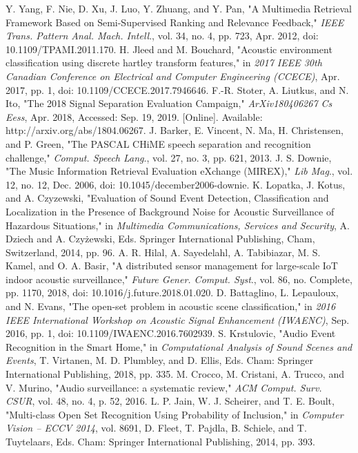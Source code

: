\documentclass{ieeeaccess}
\begin{document}
\begin{thebibliography}{00}
	Y. Yang, F. Nie, D. Xu, J. Luo, Y. Zhuang, and Y. Pan, "A Multimedia Retrieval Framework Based on Semi-Supervised Ranking and Relevance Feedback," \textit{IEEE Trans. Pattern Anal. Mach. Intell}., vol. 34, no. 4, pp. 723, Apr. 2012, doi: 10.1109/TPAMI.2011.170.
	H. Jleed and M. Bouchard, "Acoustic environment classification using discrete hartley transform features," in \textit{2017 IEEE 30th Canadian Conference on Electrical and Computer Engineering (CCECE)}, Apr. 2017, pp. 1, doi: 10.1109/CCECE.2017.7946646.
	F.-R. Stoter, A. Liutkus, and N. Ito, "The 2018 Signal Separation Evaluation Campaign," \textit{ArXiv180406267 Cs Eess}, Apr. 2018, Accessed: Sep. 19, 2019. [Online]. Available: http://arxiv.org/abs/1804.06267.
	J. Barker, E. Vincent, N. Ma, H. Christensen, and P. Green, "The PASCAL CHiME speech separation and recognition challenge," \textit{Comput. Speech Lang}., vol. 27, no. 3, pp. 621, 2013.
	J. S. Downie, "The Music Information Retrieval Evaluation eXchange (MIREX)," \textit{Lib Mag}., vol. 12, no. 12, Dec. 2006, doi: 10.1045/december2006-downie.
	K. Lopatka, J. Kotus, and A. Czyzewski, "Evaluation of Sound Event Detection, Classification and Localization in the Presence of Background Noise for Acoustic Surveillance of Hazardous Situations," in \textit{Multimedia Communications, Services and Security}, A. Dziech and A. Czyżewski, Eds. Springer International Publishing, Cham, Switzerland, 2014, pp. 96.
	A. R. Hilal, A. Sayedelahl, A. Tabibiazar, M. S. Kamel, and O. A. Basir, "A distributed sensor management for large-scale IoT indoor acoustic surveillance," \textit{Future Gener. Comput. Syst}., vol. 86, no. Complete, pp. 1170, 2018, doi: 10.1016/j.future.2018.01.020.
	D. Battaglino, L. Lepauloux, and N. Evans, "The open-set problem in acoustic scene classification," in \textit{2016 IEEE International Workshop on Acoustic Signal Enhancement (IWAENC)}, Sep. 2016, pp. 1, doi: 10.1109/IWAENC.2016.7602939.
	S. Krstulovic, "Audio Event Recognition in the Smart Home," in \textit{Computational Analysis of Sound Scenes and Events}, T. Virtanen, M. D. Plumbley, and D. Ellis, Eds. Cham: Springer International Publishing, 2018, pp. 335.
	M. Crocco, M. Cristani, A. Trucco, and V. Murino, "Audio surveillance: a systematic review,"\textit{ ACM Comput. Surv. CSUR}, vol. 48, no. 4, p. 52, 2016.
	L. P. Jain, W. J. Scheirer, and T. E. Boult, "Multi-class Open Set Recognition Using Probability of Inclusion," in \textit{Computer Vision – ECCV 2014}, vol. 8691, D. Fleet, T. Pajdla, B. Schiele, and T. Tuytelaars, Eds. Cham: Springer International Publishing, 2014, pp. 393.

\end{thebibliography}
\end{document}
